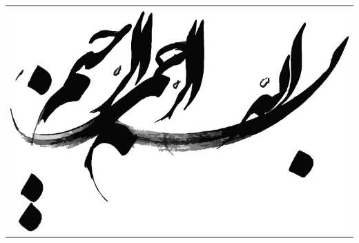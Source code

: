 \documentclass[oneside, a4paper,11pt]{book}
\numberwithin{equation}{chapter}
\numberwithin{table}{chapter}
\numberwithin{figure}{chapter}
\numberwithin{equation}{chapter}
\begin{document}
\newpage
\thispagestyle{empty}
\begin{tabular}{c}
\vspace{5cm}\\
\includegraphics[width=16cm]{Figures/besm.pdf}\\
\end{tabular}
%


\newpage
\thispagestyle{empty}
\mbox{}
\end{document}
